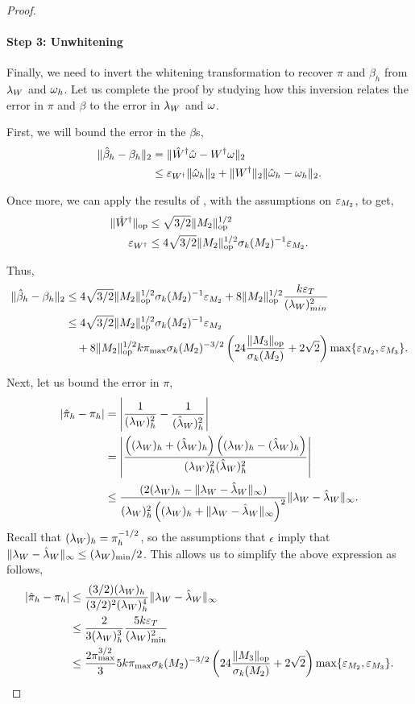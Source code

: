 \begin{proof}
\paragraph{Step 3: Unwhitening}

Finally, we need to invert the whitening transformation to recover $\pi$ and
$\beta_h$ from $\lW$ and $\mW_h$. Let us complete the proof by
studying how this inversion relates the error in $\pi$ and $\beta$ to
the error in $\lW$ and $\mW$.

First, we will bound the error in the $\beta$s,
\begin{align*}
  \|\hat \beta_h - \beta_h\|_2
  &= \| \Whinv \mhW - \Winv \mW \|_2 \\
  &\le \aerr{\Winv} \|\mhW_h\|_2 + \|\Winv\|_2 \|\mhW_h - \mW_h \|_2. \comment{Triangle inequality}
\end{align*}

Once more, we can apply the results of , with the assumptions on $\aerr{M_2}$, to get, 
\begin{align*}
  \|\Whinv\|_\op &\le \sqrt{3/2} \|M_2\|_\op^{1/2} \\
  \aerr{\Winv} &\le 4\sqrt{3/2} \|M_2\|_\op^{1/2} \sigma_k(M_2)^{-1} \aerr{M_2}.
\end{align*}

Thus,
\begin{align*}
  \|\hat \beta_h - \beta_h\|_2
  &\le 4\sqrt{3/2} \|M_2\|_\op^{1/2} \sigma_k(M_2)^{-1} \aerr{M_2} 
    + 8 \|M_2\|_\op^{1/2} \frac{k \aerr{T}}{(\lW)_{min}^2} \\
    &\le 4\sqrt{3/2} \|M_2\|_\op^{1/2} \sigma_k(M_2)^{-1} \aerr{M_2} \\
  &\quad + 8 \|M_2\|_\op^{1/2} k \pi_{\max} 
    \sigma_k(M_2)^{-3/2}
      \left(24 \frac{\| {M_3} \|_\op}{\sigma_k(M_2)} + 2\sqrt{2} \right)
      \max\{\aerr{M_2}, \aerr{M_3}\}.
\end{align*}

Next, let us bound the error in $\pi$,
\begin{align*}
  |\hat \pi_h - \pi_h |
  &= \left| \frac{1}{(\lW)_h^2} - \frac{1}{(\lhW)_h^2} \right| \\
  &= \left| \frac{\left( (\lW)_h + (\lhW)_h \right) \left( (\lW)_h - (\lhW)_h \right)}
  {(\lW)_h^2(\lhW)_h^2} \right| \\
  &\le \frac{( 2(\lW)_h - \|\lW - \lhW\|_{\infty} )}{(\lW)_h^2 \left( (\lW)_h + \|\lW - \lhW\|_{\infty} \right)^2} \|\lW - \lhW\|_{\infty}.
\end{align*}
Recall that $(\lW)_h = \pi_h^{-1/2}$, so the
assumptions that $\epsilon$ imply that $\|\lW - \lhW \|_{\infty} \le
(\lW)_{\min}/2$. This allows us to simplify the above expression as
follows,
\begin{align*}
  |\hat \pi_h - \pi_h |
  &\le \frac{(3/2)(\lW)_h}{(3/2)^2 (\lW)_h^4}
  \|\lW - \lhW\|_{\infty} \\
  &\le \frac{2}{3(\lW)_h^3} \frac{5 k \aerr{T}}{(\lW)_{\min}^2} \\
  &\le \frac{2 \pi_{\max}^{3/2}}{3} 5 k \pi_{\max} 
    \sigma_k(M_2)^{-3/2}
    \left(24 \frac{\| {M_3} \|_\op}{\sigma_k(M_2)} + 2\sqrt{2} \right) \max\{\aerr{M_2}, \aerr{M_3}\}.
\end{align*}


\end{proof}
